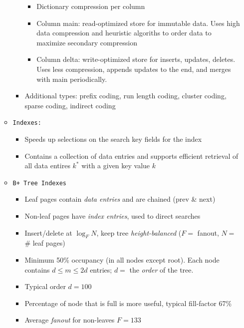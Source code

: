 \documentclass[landscape,8pt]{extarticle}
\newcommand{\code}{\lstinline}
\begin{document}
\begin{multicols}{4}
\begin{itemize}
\begin{itemize}
\begin{itemize}
\begin{itemize}
                                      \item Dictionary compression per column
                                      \item Column main: read-optimized store for immutable data. Uses high data compression and heuristic algoriths to order data to maximize secondary compression
                                      \item Column delta: write-optimized store for inserts, updates, deletes. Uses less compression, appends updates to the end, and merges with main periodically.
                                  \end{itemize}
                            \item Additional types: prefix coding, run length coding, cluster coding, sparse coding, indirect coding
                        \end{itemize}
                  \item \code{Indexes:}
                        \begin{itemize}
                            \item Speeds up selections on the search key fields for the index
                            \item Contains a collection of data entries and supports efficient retrieval of all data entires $k^*$ with a given key value $k$
                        \end{itemize}
                  \item \code{B+ Tree Indexes}
                        \begin{itemize}
                            \item Leaf pages contain \emph{data entries} and are chained (prev \& next)
                            \item Non-leaf pages have \emph{index entries}, used to direct searches
                            \item Insert/delete at $\log_F N$, keep tree \emph{height-balanced} ($F = $ fanout, $N = $ \# leaf pages)
                            \item Minimum 50\% occupancy (in all nodes except root). Each node contains $d \leq m \leq 2d$ entries; $d = $ the \emph{order} of the tree.
                            \item Typical order $d = 100$
                            \item Percentage of node that is full is more useful, typical fill-factor 67\%
                            \item Average \emph{fanout} for non-leaves $F = 133$

\end{itemize}
\end{itemize}
\end{itemize}
\end{multicols}
\end{document}
